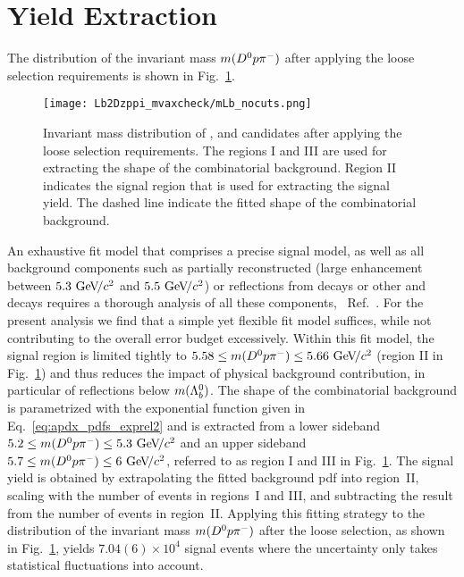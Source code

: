 \section{Yield Extraction}
\label{sec:LbToDzppi_yields}
The distribution of the invariant mass $m({{D}^0}{p}{{\pi}^-})$ after applying the loose selection requirements is shown in Fig.~\ref{fig:LbToDzppi_mLb_nocuts}.
\begin{figure}[htbp]
    \centering
    \texttt{[image: Lb2Dzppi\_mvaxcheck/mLb\_nocuts.png]}
    \caption{Invariant mass distribution of \Dz, \proton and \pim candidates after applying the loose selection requirements. The regions I and III are used for extracting the shape of the combinatorial background. Region II indicates the signal region that is used for extracting the signal yield. The dashed line indicate the fitted shape of the combinatorial background.}
    \label{fig:LbToDzppi_mLb_nocuts}
\end{figure}
An exhaustive fit model that comprises a precise signal model, as well as all background components such as partially reconstructed \decay{\Lb}{\Dstarz\proton\pim} (large enhancement between $5.3\,{\mathrm{\,Ge\kern -0.1em V\!/}c^2}$ and $5.5\,{\mathrm{\,Ge\kern -0.1em V\!/}c^2}$) or \glspl{reflection} from \decay{\Lb}{\Dz\proton\Km} decays or other \Bd and \Bs decays requires a thorough analysis of all these components, \cf{}~Ref.~\cite{LbToDzphAndLch}.
For the present analysis we find that a simple yet flexible fit model suffices, while not contributing to the overall error budget excessively.
Within this fit model, the signal region is limited tightly to $5.58 \le m({{D}^0}{p}{{\pi}^-}) \le 5.66\,{\mathrm{\,Ge\kern -0.1em V\!/}c^2}$ (region II in Fig.~\ref{fig:LbToDzppi_mLb_nocuts}) and thus reduces the impact of physical background contribution, in particular of \glspl{reflection} below $m({{\Lambda}^0_{b}})$.
The shape of the combinatorial background is parametrized with the exponential function given in Eq.~\eqref{eq:apdx_pdfs_exprel2} and is extracted from a lower sideband $5.2 \le m({{D}^0}{p}{{\pi}^-}) \le 5.3\,{\mathrm{\,Ge\kern -0.1em V\!/}c^2}$ and an upper sideband $5.7 \le m({{D}^0}{p}{{\pi}^-}) \le 6\,{\mathrm{\,Ge\kern -0.1em V\!/}c^2}$, referred to as region I and III in Fig.~\ref{fig:LbToDzppi_mLb_nocuts}.
The signal yield is obtained by extrapolating the fitted background \gls{pdf} into region~II, scaling with the number of events in regions~I and III, and subtracting the result from the number of events in region~II.
Applying this fitting strategy to the distribution of the invariant mass $m({{D}^0}{p}{{\pi}^-})$ after the loose selection, as shown in Fig.~\ref{fig:LbToDzppi_mLb_nocuts}, yields $7.04(6) \times 10^4$ signal events where the uncertainty only takes statistical fluctuations into account.
